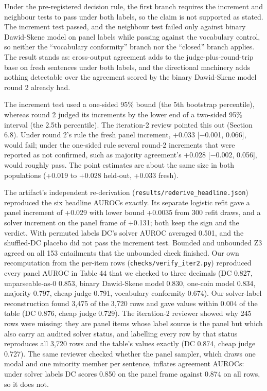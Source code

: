 \documentclass[11pt,letterpaper]{article}
\begin{document}
Under the pre-registered decision rule, the first branch requires the increment and neighbour tests to pass under both labels, so the claim is not supported as stated. The increment test passed, and the neighbour test failed only against binary Dawid-Skene model on panel labels while passing against the vocabulary control, so neither the ``vocabulary conformity'' branch nor the ``closed'' branch applies. The result stands as: cross-output agreement adds to the judge-plus-round-trip base on fresh sentences under both labels, and the directional machinery adds nothing detectable over the agreement scored by the binary Dawid-Skene model round 2 already had.

The increment test used a one-sided 95\% bound (the 5th bootstrap percentile), whereas round 2 judged its increments by the lower end of a two-sided 95\% interval (the 2.5th percentile). The iteration-2 review pointed this out (Section 6.8). Under round 2's rule the fresh panel increment, +0.033 [$-$0.001, 0.066], would fail; under the one-sided rule several round-2 increments that were reported as not confirmed, such as majority agreement's +0.028 [$-$0.002, 0.056], would roughly pass. The point estimates are about the same size in both populations (+0.019 to +0.028 held-out, +0.033 fresh).

The artifact's independent re-derivation (\texttt{results/\allowbreak{}rederive\_\allowbreak{}\allowbreak{}headline.json}) reproduced the six headline AUROCs exactly. Its separate logistic refit gave a panel increment of +0.029 with lower bound +0.0035 from 300 refit draws, and a solver increment on the panel frame of +0.131; both keep the sign and the verdict. With permuted labels DC's solver AUROC averaged 0.501, and the shuffled-DC placebo did not pass the increment test. Bounded and unbounded Z3 agreed on all 153 entailments that the unbounded check finished. Our own recomputation from the per-item rows (\texttt{checks/\allowbreak{}verify\_\allowbreak{}\allowbreak{}iter2.py}) reproduced every panel AUROC in Table 44 that we checked to three decimals (DC 0.827, unparseable-as-0 0.853, binary Dawid-Skene model 0.830, one-coin model 0.834, majority 0.797, cheap judge 0.791, vocabulary conformity 0.674). Our solver-label reconstruction found 3,475 of the 3,720 rows and gave values within 0.004 of the table (DC 0.876, cheap judge 0.729). The iteration-2 reviewer showed why 245 rows were missing: they are panel items whose label source is the panel but which also carry an audited solver status, and labelling every row by that status reproduces all 3,720 rows and the table's values exactly (DC 0.874, cheap judge 0.727). The same reviewer checked whether the panel sampler, which draws one modal and one minority member per sentence, inflates agreement AUROCs: under solver labels DC scores 0.850 on the panel frame against 0.874 on all rows, so it does not.
\end{document}
